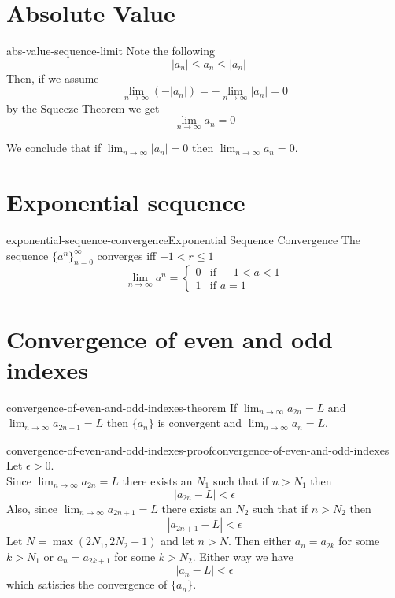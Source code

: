 \documentclass[preview]{standalone}
\begin{document}
\section{Absolute Value}

\begin{snippet}{abs-value-sequence-limit}
Note the following
\[
    -|a_n| \leq a_n \leq |a_n|
\]
Then, if we assume
\[
    \lim_{n\to\infty} (-|a_n|) = - \lim_{n\to\infty} |a_n| =0 
\]
by the Squeeze Theorem we get
\[
    \lim_{n\to\infty} a_n =0
\]

We conclude that if \(\lim_{n\to\infty} |a_n|=0\) then
\(\lim_{n\to\infty} a_n=0\).
\end{snippet}

\section{Exponential sequence} %

\begin{snippettheorem}{exponential-sequence-convergence}{Exponential Sequence Convergence}
    The sequence \({\{a^n\}}_{n=0}^\infty\) converges iff \(-1<r\leq 1\)
    \[
        \lim_{n\to\infty} a^n = \begin{cases}
            0 & \text{if } -1 < a < 1 \\
            1 & \text{if } a=1
        \end{cases}
    \]
\end{snippettheorem}

\section{Convergence of even and odd indexes}

\begin{snippettheorem}{convergence-of-even-and-odd-indexes-theorem}{}
    If \(\lim_{n\to\infty}a_{2n}=L\) and \(\lim_{n\to\infty}a_{2n+1}=L\)
    then \(\{a_n\}\) is convergent and \(\lim_{n\to\infty}a_n=L\).
\end{snippettheorem}

\begin{snippetproof}{convergence-of-even-and-odd-indexes-proof}{convergence-of-even-and-odd-indexes}{}
    Let \(\epsilon>0\). \\
    Since \(\lim_{n\to\infty}a_{2n}=L\) there exists an \(N_1\) such that
    if \(n>N_1\) then
    \[
        |a_{2n}-L|<\epsilon
    \]
    Also, since \(\lim_{n\to\infty}a_{2n+1}=L\) there exists an \(N_2\) such that
    if \(n>N_2\) then
    \[
        |a_{2n+1}-L|<\epsilon
    \]
    Let \(N=\max(2N_1, 2N_2+1)\) and let \(n>N\).
    Then either \(a_n=a_{2k}\) for some \(k>N_1\) or \(a_n=a_{2k+1}\)
    for some \(k>N_2\). Either way we have
    \[
        |a_n-L|<\epsilon
    \]
    which satisfies the convergence of \(\{a_n\}\).
\end{snippetproof}
\end{document}
